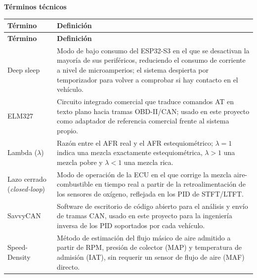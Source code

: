 \vspace{2mm}
\begin{center}\textbf{Términos técnicos}\end{center}
\begin{longtable}{@{}p{3.6cm}p{10.5cm}@{}}
	\toprule
	\rowcolor[rgb]{.851,.851,.851}
	\textbf{Término} & \textbf{Definición} \\
	\midrule
	\endfirsthead
	\toprule
	\rowcolor[rgb]{.851,.851,.851}
	\textbf{Término} & \textbf{Definición} \\
	\midrule
	\endhead
	Deep sleep & Modo de bajo consumo del ESP32-S3 en el que se desactivan la mayoría de sus periféricos, reduciendo el consumo de corriente a nivel de microamperios; el sistema despierta por temporizador para volver a comprobar si hay contacto en el vehículo. \\
	ELM327 & Circuito integrado comercial que traduce comandos AT en texto plano hacia tramas OBD-II/CAN; usado en este proyecto como adaptador de referencia comercial frente al sistema propio. \\
	Lambda ($\lambda$) & Razón entre el AFR real y el AFR estequiométrico; $\lambda=1$ indica una mezcla exactamente estequiométrica, $\lambda>1$ una mezcla pobre y $\lambda<1$ una mezcla rica. \\
	Lazo cerrado (\textit{closed-loop}) & Modo de operación de la ECU en el que corrige la mezcla aire-combustible en tiempo real a partir de la retroalimentación de los sensores de oxígeno, reflejada en los PID de STFT/LTFT. \\
	SavvyCAN & Software de escritorio de código abierto para el análisis y envío de tramas CAN, usado en este proyecto para la ingeniería inversa de los PID soportados por cada vehículo. \\
	Speed-Density & Método de estimación del flujo másico de aire admitido a partir de RPM, presión de colector (MAP) y temperatura de admisión (IAT), sin requerir un sensor de flujo de aire (MAF) directo. \\
	\bottomrule
\end{longtable}
